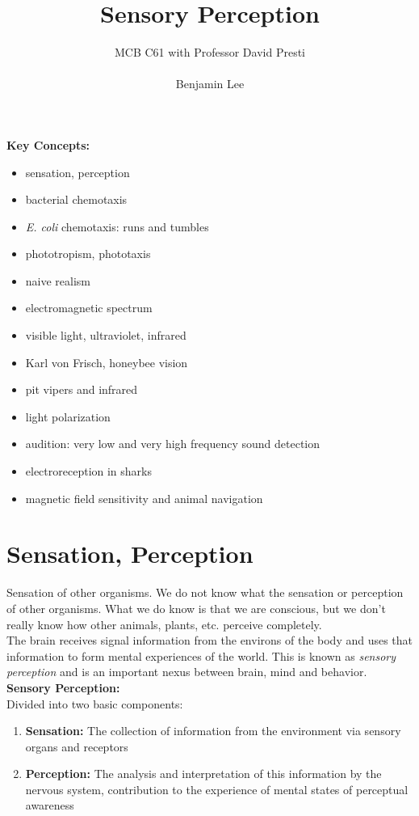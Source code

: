 \documentclass{article}
\title{Sensory Perception}
\author{MCB C61 with Professor David Presti \\ \\ Benjamin Lee}
\begin{document}
\maketitle

\textbf{Key Concepts:}
\begin{itemize}
    \item sensation, perception
    \item bacterial chemotaxis
    \item \textit{E. coli} chemotaxis: runs and tumbles
    \item phototropism, phototaxis
    \item naive realism 
    \item electromagnetic spectrum
    \item visible light, ultraviolet, infrared
    \item Karl von Frisch, honeybee vision
    \item pit vipers and infrared
    \item light polarization
    \item audition: very low and very high frequency sound detection
    \item electroreception in sharks
    \item magnetic field sensitivity and animal navigation
\end{itemize}
\newpage

\section{Sensation, Perception}
Sensation of other organisms. We do not know what the sensation or perception of other organisms. What we do know is that we are conscious, but we don't really know how other animals, plants, etc. perceive completely. \\
The brain receives signal information from the environs of the body and uses that information to form mental experiences of the world. This is known as \textit{sensory perception} and is an important nexus between brain, mind and behavior. \\
\textbf{Sensory Perception:} \\
Divided into two basic components:
\begin{enumerate}
    \item \textbf{Sensation:} The collection of information from the environment via sensory organs and receptors
    \item \textbf{Perception:} The analysis and interpretation of this information by the nervous system, contribution to the experience of mental states of perceptual awareness
\end{enumerate}
\end{document}
